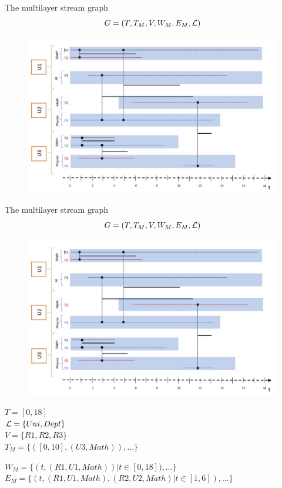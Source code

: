 \documentclass[15pt]{beamer}
\begin{document}
\begin{frame}{The multilayer stream graph}
\[
G=(T,T_M,V,W_M,E_M,\cal{L})
\]

\begin{figure}
    \centering
    \includegraphics[width=\linewidth]{img/chercheurs.jpg}
    \label{fig:chercheurs}
\end{figure}
\end{frame}
\begin{frame}{The multilayer stream graph}
	\[
		G=(T,T_M,V,W_M,E_M,\cal{L})
	\]
	\begin{minipage}{0.59\linewidth}
		\begin{figure}
    		\centering
    		\includegraphics[width=\linewidth]{img/chercheurs.jpg}
    		\label{fig:chercheurs}
		\end{figure}
	\end{minipage}
	\begin{minipage}{0.4\textwidth}
		\begin{footnotesize}
			$T=[0,18]$\\ \pause
			${\cal L} = \{Uni,Dept\}$\\ \pause
			$V=\{R1,R2,R3\}$\\ \pause
			$T_M= \{([0,10],(U3,Math)), \dots \}$
		\end{footnotesize}
	\end{minipage}

	\begin{footnotesize}
		$W_M = \{ (t,(R1,U1,Math))| t \in [0,18]), \dots \}$ \pause
		\\
		$E_M= \{ (t,(R1,U1,Math),(R2,U2,Math)| t \in [1,6]), \dots \}$ 	
	\end{footnotesize}
\end{frame}
\end{document}
